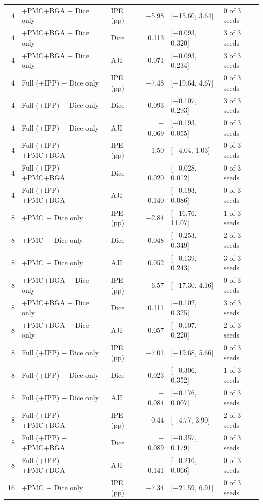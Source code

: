 \documentclass[10pt]{article}
\begin{document}
\begin{landscape}
{\begin{longtable}{r l l r l l}
4 & +PMC+BGA $-$ Dice only & IPE (pp) & $-$5.98 & [$-$15.60, 3.64] & 0 of 3 seeds \\
4 & +PMC+BGA $-$ Dice only & Dice & 0.113 & [$-$0.093, 0.320] & 3 of 3 seeds \\
4 & +PMC+BGA $-$ Dice only & AJI & 0.071 & [$-$0.093, 0.234] & 3 of 3 seeds \\
4 & Full (+IPP) $-$ Dice only & IPE (pp) & $-$7.48 & [$-$19.64, 4.67] & 0 of 3 seeds \\
4 & Full (+IPP) $-$ Dice only & Dice & 0.093 & [$-$0.107, 0.293] & 3 of 3 seeds \\
4 & Full (+IPP) $-$ Dice only & AJI & $-$0.069 & [$-$0.193, 0.055] & 0 of 3 seeds \\
4 & Full (+IPP) $-$ +PMC+BGA & IPE (pp) & $-$1.50 & [$-$4.04, 1.03] & 0 of 3 seeds \\
4 & Full (+IPP) $-$ +PMC+BGA & Dice & $-$0.020 & [$-$0.028, $-$0.012] & 0 of 3 seeds \\
4 & Full (+IPP) $-$ +PMC+BGA & AJI & $-$0.140 & [$-$0.193, $-$0.086] & 0 of 3 seeds \\
8 & +PMC $-$ Dice only & IPE (pp) & $-$2.84 & [$-$16.76, 11.07] & 1 of 3 seeds \\
8 & +PMC $-$ Dice only & Dice & 0.048 & [$-$0.253, 0.349] & 2 of 3 seeds \\
8 & +PMC $-$ Dice only & AJI & 0.052 & [$-$0.139, 0.243] & 3 of 3 seeds \\
8 & +PMC+BGA $-$ Dice only & IPE (pp) & $-$6.57 & [$-$17.30, 4.16] & 0 of 3 seeds \\
8 & +PMC+BGA $-$ Dice only & Dice & 0.111 & [$-$0.102, 0.325] & 3 of 3 seeds \\
8 & +PMC+BGA $-$ Dice only & AJI & 0.057 & [$-$0.107, 0.220] & 2 of 3 seeds \\
8 & Full (+IPP) $-$ Dice only & IPE (pp) & $-$7.01 & [$-$19.68, 5.66] & 0 of 3 seeds \\
8 & Full (+IPP) $-$ Dice only & Dice & 0.023 & [$-$0.306, 0.352] & 1 of 3 seeds \\
8 & Full (+IPP) $-$ Dice only & AJI & $-$0.084 & [$-$0.176, 0.007] & 0 of 3 seeds \\
8 & Full (+IPP) $-$ +PMC+BGA & IPE (pp) & $-$0.44 & [$-$4.77, 3.90] & 2 of 3 seeds \\
8 & Full (+IPP) $-$ +PMC+BGA & Dice & $-$0.089 & [$-$0.357, 0.179] & 0 of 3 seeds \\
8 & Full (+IPP) $-$ +PMC+BGA & AJI & $-$0.141 & [$-$0.216, $-$0.066] & 0 of 3 seeds \\
16 & +PMC $-$ Dice only & IPE (pp) & $-$7.34 & [$-$21.59, 6.91] & 0 of 3 seeds \\

\end{longtable}}
\end{landscape}
\end{document}
